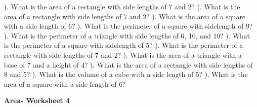 \documentclass{article}%
\begin{document}
\newline%
). What is the area of a rectangle with side lengths of 7 and 2?%
\newline%
\newline%
). What is the area of a rectangle with side lengths of 7 and 2?%
\newline%
\newline%
). What is the area of a square with a side length of 6?%
\newline%
\newline%
). What is the perimeter of a square with sidelength of 9?%
\newline%
\newline%
). What is the perimeter of a triangle with side lengths of 6, 10, and 10?%
\newline%
\newline%
). What is the perimeter of a square with sidelength of 5?%
\newline%
\newline%
). What is the perimeter of a rectangle with side lengths of 7 and 2?%
\newline%
\newline%
). What is the area of a triangle with a base of 7 and a height of 4?%
\newline%
\newline%
). What is the area of a rectangle with side lengths of 8 and 5?%
\newline%
\newline%
). What is the volume of a cube with a side length of 5?%
\newline%
\newline%
). What is the area of a square with a side length of 6?%
\newline%
\newline%
\newline%
\pagebreak%
\large%
\begin{center}%
\textbf{Area- Worksheet 4}%
\newline%
\newline%
\newline%
\end{center} \normalsize%
\end{document}
